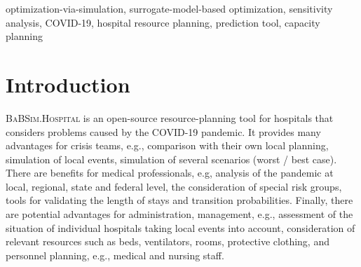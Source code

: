 \documentclass[conference]{IEEEtran}
\newcommand{\babsimhospital}{\textsc{BaBSim.Hospital}\xspace}
\begin{document}
\begin{abstract}
Hospitals and health-care institutions need to plan the resources required for handling the increased load, i.e.,  beds and ventilators during the COVID-19 pandemic. 
\babsimhospital, an open-source tool for capacity planning based on discrete event simulation,  was developed over the last year to support doctors, administrations, health authorities, and crisis teams in Germany.
To obtain reliable results, 29 simulation parameters such as durations and probabilities must be specified. While reasonable default values were obtained in detailed discussions with medical professionals, the parameters have to be regularly and automatically optimized based on current data. 
We aim to investigate how a set of parameters that is tailored to the German health system can be transferred to other regions. Therefore, we will use data from the UK. Our study demonstrates the flexibility of the discrete event simulation approach. However, transferring the optimal German parameter settings to the UK situation does not work---parameter ranges must be modified. The adaptation has been shown to reduce simulation errors by nearly 70\%. 
The simulation-via-optimization approach is not restricted to health-care institutions, it is applicable to many other real-world problems, e.g., the development of new elevator systems to cover the last mile or simulation of student flow in academic study periods.
\end{abstract}

\begin{IEEEkeywords}
optimization-via-simulation, surrogate-model-based optimization, sensitivity analysis, COVID-19, hospital resource planning, prediction tool, capacity planning
\end{IEEEkeywords}


\section{Introduction}\label{sec:intro}
\babsimhospital is an open-source resource-planning tool for hospitals that considers problems caused by the \gls{COVID-19} pandemic. It provides many advantages for crisis teams, e.g., comparison with their own local planning, simulation of local events, simulation of several scenarios (worst / best case). 
There are benefits for medical professionals, e.g, analysis of the pandemic at local, regional, state and federal level, the  consideration of special risk groups, tools for validating the length of stays and transition probabilities. Finally, there are potential advantages for administration, management, e.g., assessment of the situation of individual hospitals taking local events into account, consideration of relevant resources such as beds, ventilators, rooms, protective clothing, and personnel planning, e.g., medical and nursing staff. 
\end{document}
